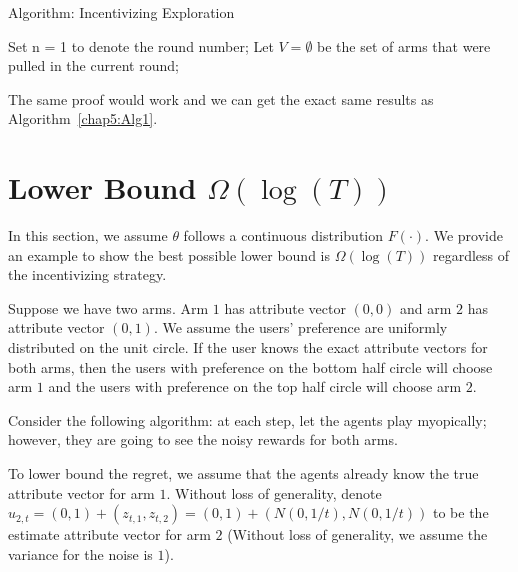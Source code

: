 \documentclass{article}
\begin{document}
\begin{algorithm}
\caption{Algorithm: Incentivizing Exploration}
\label{Alg2}
\begin{algorithmic}
\STATE Set n = 1 to denote the round number; Let $V=\emptyset$ be the set of arms that were pulled in the current round;
\ENDFOR

\end{algorithmic}
\end{algorithm}


The same proof would work and we can get the exact same results as Algorithm~\ref{chap5:Alg1}. 

\section{Lower Bound $\Omega(\log(T))$}
\label{sec:lb}

In this section, we assume $\theta$ follows a continuous distribution $F(\cdot)$. We provide an example to show the best possible lower bound is $\Omega(\log(T))$ regardless of the incentivizing strategy.

Suppose we have two arms. Arm $1$ has attribute vector $(0,0)$ and arm $2$ has attribute vector $(0,1)$. We assume the users' preference are uniformly distributed on the unit circle. If the user knows the exact attribute vectors for both arms, then the users with preference on the bottom half circle will choose arm $1$ and the users with preference on the top half circle will choose arm $2$.

Consider the following algorithm: at each step, let the agents play myopically; however, they are going to see the noisy rewards for both arms.

To lower bound the regret, we assume that the agents already know the true attribute vector for arm $1$. Without loss of generality, denote $u_{2,t} = (0,1)+(z_{t,1},z_{t,2}) = (0,1)+ (N(0,1/t),N(0,1/t))$ to be the estimate attribute vector for arm $2$ (Without loss of generality, we assume the variance for the noise is $1$). 
\end{document}
